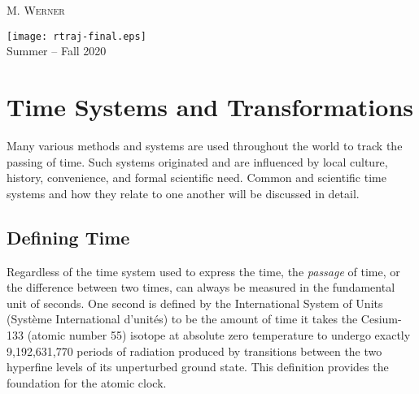 \documentclass[11pt,dvipsnames]{thesis}
\begin{document}
\begin{titlepage}
	M. \textsc{Werner} %
	
	\vfill\vfill
    \hspace*{0cm}\texttt{[image: rtraj-final.eps]}\\[4cm] %

	\vfill
	{\large Summer -- Fall 2020} %
	

	
	 
	
\end{titlepage}

\tableofcontents
\chapter{Time Systems and Transformations}
Many various methods and systems are used throughout the world to track the passing of time. Such systems originated and are influenced by local culture, history, convenience, and formal scientific need. Common and scientific time systems and how they relate to one another will be discussed in detail.

\section{Defining Time}
Regardless of the time system used to express the time, the \textit{passage} of time, or the difference between two times, can always be measured in the fundamental unit of seconds. One second is defined by the International System of Units (Syst\`eme International d'unit\'es) to be the amount of time it takes the Cesium-133 (atomic number 55) isotope at absolute zero temperature to undergo exactly 9,192,631,770 periods of radiation produced by transitions between the two hyperfine levels of its unperturbed ground state. This definition provides the foundation for the atomic clock.
\end{document}
